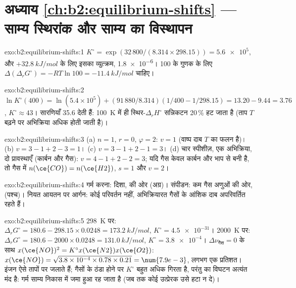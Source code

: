 \section*{अध्याय \ref{ch:b2:equilibrium-shifts} --- साम्य स्थिरांक और साम्य का विस्थापन}

\begin{solution}{exo:b2:equilibrium-shifts:1}
$K^\circ = \exp(32\,800/(8.314 \times 298.15)) = \num{5.6e5}$, और
$+\qty{32.8}{kJ/mol}$ के लिए इसका व्युत्क्रम, \num{1.8e-6}। 100 के गुणक के लिए
$\Delta(\Delta_r G^\circ) = -RT\ln 100 = \qty{-11.4}{kJ/mol}$ चाहिए।
\end{solution}

\begin{solution}{exo:b2:equilibrium-shifts:2}
$\ln K^\circ(400) = \ln(5.4 \times 10^5) + (91\,880/8.314)(1/400 -
1/298.15) = 13.20 - 9.44 = 3.76$, $K^\circ \approx 43$। सारणियाँ 35.6 देती हैं:
\qty{100}{K} में ही स्थिर-$\Delta_r H^\circ$ सन्निकटन 20\,\% हट जाता है
(ताप $T$ बढ़ने पर अभिक्रिया अधिक  होती जाती है)।
\end{solution}

\begin{solution}{exo:b2:equilibrium-shifts:3}
(a) $n = 1$, $r = 0$, $\varphi = 2$: $v = 1$ (वाष्प दाब
$T$ का फलन है)। (b) $v = 3 - 1 + 2 - 3 = 1$। (c) $v = 3 - 1 + 2 - 1 = 3$। (d) चार
स्पीशीज़, एक अभिक्रिया, दो प्रावस्थाएँ (कार्बन और गैस): $v = 4 - 1 + 2 - 2 =
3$; यदि गैस केवल कार्बन और भाप से बनी है, तो गैस में $n(\ce{CO}) = n(\ce{H2})$,
$s = 1$ और $v = 2$।
\end{solution}

\begin{solution}{exo:b2:equilibrium-shifts:4}
गर्म करना:  दिशा,  की ओर (अग्र)। संपीडन:
कम गैस अणुओं की ओर,  (पश्च)। नियत आयतन पर आर्गन:
कोई परिवर्तन नहीं, अभिक्रियारत गैसों के आंशिक दाब अपरिवर्तित रहते हैं।
\end{solution}

\begin{solution}{exo:b2:equilibrium-shifts:5}
\qty{298}{K} पर: $\Delta_r G^\circ = 180.6 - 298.15 \times 0.0248 =
\qty{173.2}{kJ/mol}$, $K^\circ = \num{4.5e-31}$। \qty{2000}{K} पर: $\Delta_r
G^\circ = 180.6 - 2000 \times 0.0248 = \qty{131.0}{kJ/mol}$, $K^\circ =
\num{3.8e-4}$। $\Delta\nu_{\text{गैस}} = 0$ के साथ $x(\ce{NO})^2 = K^\circ x(\ce{N2})
x(\ce{O2})$: $x(\ce{NO}) = \sqrt{3.8 \times 10^{-4} \times 0.78 \times 0.21} =
\num{7.9e-3}$, लगभग एक प्रतिशत। इंजन ऐसे तापों पर जलाते हैं; गैसों के
ठंडा होने पर $K^\circ$ बहुत अधिक गिरता है, परंतु  का विघटन
अत्यंत मंद है: गर्म साम्य निकास में जमा हुआ रह जाता है (जब तक कोई उत्प्रेरक
उसे हटा न दे)।
\end{solution}

